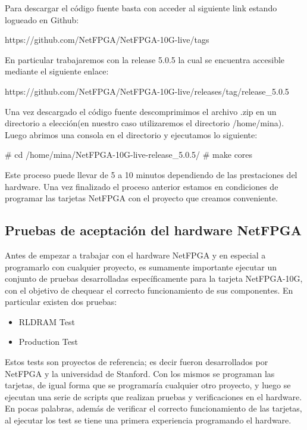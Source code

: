 Para descargar el código fuente basta con acceder al siguiente link estando logueado en Github:

\begin{center}
https://github.com/NetFPGA/NetFPGA-10G-live/tags
\end{center}

En particular trabajaremos con la release 5.0.5 la cual se encuentra accesible mediante el siguiente enlace:
 
\begin{center}
https://github.com/NetFPGA/NetFPGA-10G-live/releases/tag/release\_5.0.5
\end{center}

Una vez descargado el código fuente descomprimimos el archivo .zip en un directorio a elección(en nuestro caso utilizaremos el directorio /home/mina). Luego abrimos una consola en el directorio y ejecutamos lo siguiente:

\begin{bash}
# cd /home/mina/NetFPGA-10G-live-release\_5.0.5/
# make cores
\end{bash}

Este proceso puede llevar de 5 a 10 minutos dependiendo de las prestaciones del hardware. Una vez finalizado el proceso anterior estamos en condiciones de programar las tarjetas NetFPGA con el proyecto que creamos conveniente.

\subsection{Pruebas de aceptación del hardware NetFPGA}
Antes de empezar a trabajar con el hardware NetFPGA y en especial a programarlo con cualquier proyecto, es sumamente importante ejecutar un conjunto de pruebas desarrolladas específicamente para la tarjeta NetFPGA-10G, con el objetivo de chequear el correcto funcionamiento de sus componentes. En particular existen dos pruebas:

\begin{itemize}
\item RLDRAM Test\citep{NetFPGA5}
\item Production Test\citep{NetFPGA7}
\end{itemize}

Estos tests son proyectos de referencia; es decir fueron desarrollados por NetFPGA y la universidad de Stanford. Con los mismos se programan las tarjetas, de igual forma que se programaría cualquier otro proyecto, y luego se ejecutan una serie de scripts que realizan pruebas y verificaciones en el hardware. En pocas palabras, además de verificar el correcto funcionamiento de las tarjetas, al ejecutar los test se tiene una primera experiencia programando el hardware.\\

